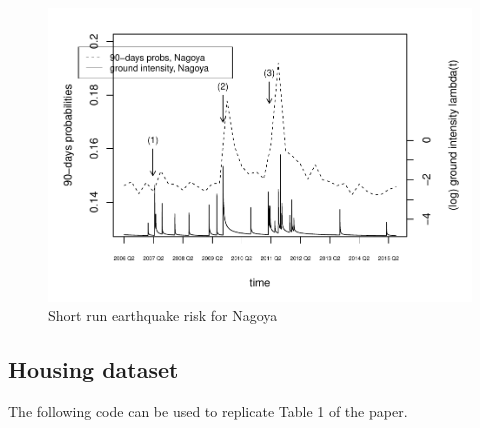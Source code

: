 \documentclass[
]{article}
\begin{document}
\begin{figure}
\centering
\includegraphics{replication_instructions_files/figure-latex/unnamed-chunk-6-1.pdf}
\caption{Short run earthquake risk for Nagoya}
\end{figure}

\hypertarget{housing-dataset}{%
\subsection{Housing dataset}\label{housing-dataset}}

The following code can be used to replicate Table 1 of the paper.
\end{document}
